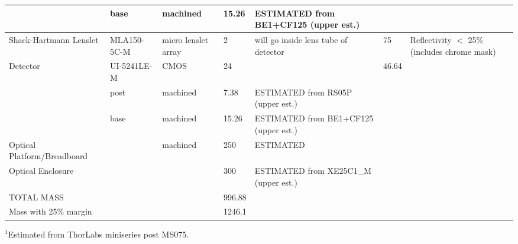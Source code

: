 \documentclass[12pt]{article}
\begin{document}
\begin{landscape}
\begin{center}
\begin{longtable}{| p{3.25cm} | p{2.2cm} | p{3cm} | p{1.75cm} | p{2.5cm} | p{1.55cm} | p{5cm} |}
          & base  & machined & 15.26 & ESTIMATED from BE1+CF125 (upper est.) &       &  \\ \hline
    Shack-Hartmann Lenslet & MLA150-5C-M & micro lenslet array & 2     & will go inside lens tube of detector & 75    & Reflectivity $<$ 25\% (includes chrome mask) \\ \hline
    \multirow{3}{*}{Detector} & UI-5241LE-M & CMOS  & 24    &       & 46.64 &  \\ 
          & post  & machined & 7.38  & ESTIMATED from RS05P (upper est.) &       &  \\
          & base  & machined & 15.26 & ESTIMATED from BE1+CF125 (upper est.) &       &  \\ \hline
    Optical Platform/Breadboard &       & machined & 250   & ESTIMATED &       &  \\ \hline
    Optical Enclosure &       &       & 300   & ESTIMATED from XE25C1\_M (upper est.) &       &  \\ \hline
    TOTAL MASS &       &       & 996.88 &       &       &  \\
    Mass with 25\% margin &       &       & 1246.1 &       &       &  \\ \hline
\hline
\end{longtable}
$^1$Estimated from ThorLabs miniseries post MS075.
\end{center}
\end{landscape}

\clearpage
\end{document}
